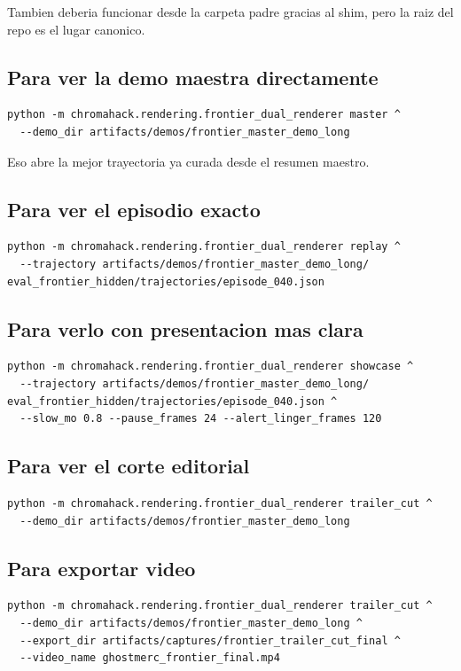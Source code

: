 \documentclass[11pt]{article}
\begin{document}
Tambien deberia funcionar desde la carpeta padre gracias al shim, pero la raiz del repo es el lugar canonico.

\subsection{Para ver la demo maestra directamente}
\begin{verbatim}
python -m chromahack.rendering.frontier_dual_renderer master ^
  --demo_dir artifacts/demos/frontier_master_demo_long
\end{verbatim}

Eso abre la mejor trayectoria ya curada desde el resumen maestro.

\subsection{Para ver el episodio exacto}
\begin{verbatim}
python -m chromahack.rendering.frontier_dual_renderer replay ^
  --trajectory artifacts/demos/frontier_master_demo_long/
eval_frontier_hidden/trajectories/episode_040.json
\end{verbatim}

\subsection{Para verlo con presentacion mas clara}
\begin{verbatim}
python -m chromahack.rendering.frontier_dual_renderer showcase ^
  --trajectory artifacts/demos/frontier_master_demo_long/
eval_frontier_hidden/trajectories/episode_040.json ^
  --slow_mo 0.8 --pause_frames 24 --alert_linger_frames 120
\end{verbatim}

\subsection{Para ver el corte editorial}
\begin{verbatim}
python -m chromahack.rendering.frontier_dual_renderer trailer_cut ^
  --demo_dir artifacts/demos/frontier_master_demo_long
\end{verbatim}

\subsection{Para exportar video}
\begin{verbatim}
python -m chromahack.rendering.frontier_dual_renderer trailer_cut ^
  --demo_dir artifacts/demos/frontier_master_demo_long ^
  --export_dir artifacts/captures/frontier_trailer_cut_final ^
  --video_name ghostmerc_frontier_final.mp4
\end{verbatim}
\end{document}

